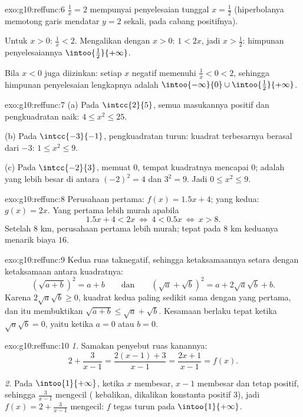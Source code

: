 \begin{solution}{exo:g10:reffunc:6}
$\frac1x = 2$ mempunyai penyelesaian tunggal $x = \frac12$ (hiperbolanya
memotong garis mendatar $y = 2$ sekali, pada cabang positifnya).

Untuk $x > 0$: $\frac1x < 2$. Mengalikan dengan $x > 0$: $1 < 2x$, jadi
$x > \frac12$: himpunan penyelesaiannya $\intoo{\frac12}{+\infty}$.

Bila $x < 0$ juga diizinkan: setiap $x$ negatif memenuhi $\frac1x < 0 < 2$,
sehingga himpunan penyelesaian lengkapnya adalah
$\intoo{-\infty}{0} \cup \intoo{\frac12}{+\infty}$.
\end{solution}

\begin{solution}{exo:g10:reffunc:7}
(a) Pada $\intcc{2}{5}$, semua masukannya positif dan pengkuadratan naik:
$4 \leq x^2 \leq 25$.

(b) Pada $\intcc{-3}{-1}$, pengkuadratan turun:
kuadrat terbesarnya berasal dari $-3$: $1 \leq x^2 \leq 9$.

(c) Pada $\intcc{-2}{3}$,  memuat $0$, tempat kuadratnya
mencapai  $0$;  adalah yang lebih besar di antara
$(-2)^2 = 4$ dan $3^2 = 9$. Jadi $0 \leq x^2 \leq 9$.
\end{solution}

\begin{solution}{exo:g10:reffunc:8}
Perusahaan pertama: $f(x) = 1.5x + 4$; yang kedua: $g(x) = 2x$. Yang pertama
lebih murah apabila
\[
1.5x + 4 < 2x
\ \Longleftrightarrow\
4 < 0.5x
\ \Longleftrightarrow\
x > 8 .
\]
Setelah $8$ km, perusahaan pertama lebih murah; tepat pada $8$ km keduanya
menarik biaya $16$.
\end{solution}

\begin{solution}{exo:g10:reffunc:9}
Kedua ruas taknegatif, sehingga ketaksamaannya setara dengan ketaksamaan
antara kuadratnya:
\[
\left(\sqrt{a+b}\right)^2 = a + b
\qquad\text{dan}\qquad
\left(\sqrt a + \sqrt b\right)^2 = a + 2\sqrt a \sqrt b + b .
\]
Karena $2\sqrt a\sqrt b \geq 0$, kuadrat kedua paling sedikit sama dengan yang
pertama, dan itu membuktikan $\sqrt{a+b} \leq \sqrt a + \sqrt b$. Kesamaan
berlaku tepat ketika $\sqrt a \sqrt b = 0$, yaitu ketika $a = 0$ atau $b = 0$.
\end{solution}

\begin{solution}{exo:g10:reffunc:10}
\emph{1.} Samakan penyebut ruas kanannya:
\[
2 + \frac{3}{x-1} = \frac{2(x-1) + 3}{x - 1} = \frac{2x + 1}{x - 1}
= f(x).
\]

\emph{2.} Pada $\intoo{1}{+\infty}$, ketika $x$ membesar, $x - 1$ membesar
dan tetap positif, sehingga $\frac{3}{x-1}$ mengecil ( kebalikan,
dikalikan konstanta positif $3$), jadi $f(x) = 2 + \frac{3}{x-1}$ mengecil:
$f$ tegas turun pada $\intoo{1}{+\infty}$.
\end{solution}

